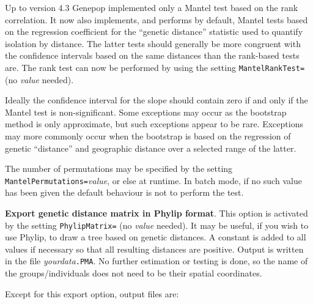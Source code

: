 \documentclass[12pt,]{book}
\theoremstyle{definition}
\theoremstyle{definition}
\theoremstyle{definition}
\theoremstyle{remark}
\begin{document}
Up to version 4.3 Genepop implemented only a Mantel test based on the
rank correlation. It now also implements, and performs by default,
Mantel tests based on the regression coefficient for the ``genetic
distance'' statistic used to quantify isolation by distance. The latter
tests should generally be more congruent with the confidence intervals
based on the same distances than the rank-based tests are. The rank test
can now be performed by using the setting \texttt{MantelRankTest=} (no
\emph{value} needed).

Ideally the confidence interval for the slope should contain zero if and
only if the Mantel test is non-significant. Some exceptions may occur as
the bootstrap method is only approximate, but such exceptions appear to
be rare. Exceptions may more commonly occur when the bootstrap is based
on the regression of genetic ``distance'' and geographic distance over a
selected range of the latter.

The number of permutations may be specified by the setting
\texttt{MantelPermutations=}\emph{value},
or else at runtime. In batch mode, if no such value has been given the
default behaviour is not to perform the test.

\textbf{Export genetic distance matrix in Phylip
format}. This option is activated
by the setting \texttt{PhylipMatrix=} (no \emph{value}
needed). It may be useful, if you wish to
use Phylip, to draw a tree based on genetic distances. A constant is
added to all values if necessary so that all resulting distances are
positive. Output is written in the file \emph{yourdata}\texttt{.PMA}. No
further estimation or testing is done, so the name of the
groups/individuals does not need to be their spatial coordinates.

Except for this export option, output files are:
\end{document}
